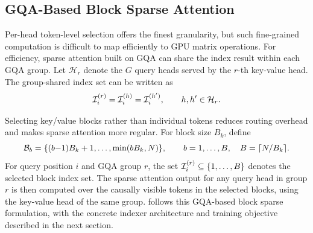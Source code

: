 \subsection{GQA-Based Block Sparse Attention}
\label{sec:preliminary-gqa-block-sparse}

Per-head token-level selection offers the finest granularity, but such fine-grained computation is difficult to map efficiently to GPU matrix operations. For efficiency, sparse attention built on GQA can share the index result within each GQA group. Let $\mathcal{H}_r$ denote the $G$ query heads served by the $r$-th key-value head. The group-shared index set can be written as
\begin{equation}
\label{eq:prelim-group-shared-support}
    {\mathcal{I}}_i^{(r)} = {\mathcal{I}}_i^{(h)} = {\mathcal{I}}_i^{(h')},
    \qquad
    h,h' \in \mathcal{H}_r .
\end{equation}

Selecting key/value blocks rather than individual tokens reduces routing overhead and makes sparse attention more regular. For block size $B_k$, define
\begin{equation}
\label{eq:prelim-key-blocks}
    {\mathcal{B}}_b
    =
    \{(b{-}1)B_k+1,\dots,\min(bB_k,N)\},
    \qquad
    b=1,\dots,B,\quad B=\lceil N/B_k\rceil .
\end{equation}
For query position $i$ and GQA group $r$, the set ${\mathcal{I}}_i^{(r)} \subseteq \{1,\dots,B\}$ denotes the selected block index set.
The sparse attention output for any query head in group $r$ is then computed over the causally visible tokens in the selected blocks, using the key-value head of the same group. \method{} follows this GQA-based block sparse formulation, with the concrete indexer architecture and training objective described in the next section.
